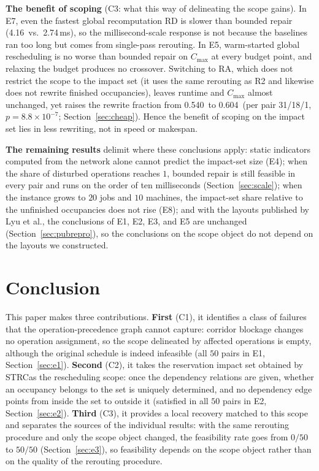\documentclass[manuscript,screen,review]{acmart}
\providecommand{\STRC}{\textsc{STRC}}
\newcommand{\NPairs}{50}
\newcommand{\FeasRone}{0/\NPairs}            %
\newcommand{\FeasRtwo}{\NPairs/\NPairs}      %
\newcommand{\MsRedecode}{4.16}       %
\newcommand{\MsCheapRtwo}{2.74}      %
\newcommand{\ResFracCheapRtwo}{0.540}
\newcommand{\ResFracAllFuture}{0.604}
\newcommand{\RAStabWTL}{31/18/1}     %
\newcommand{\RAStabP}{8.8\times10^{-7}}  %
\newcommand{\ScaleJobsHi}{20}
\newcommand{\ScaleMachHi}{10}
\begin{document}
\textbf{The benefit of scoping} (C3: what this way of delineating the scope gains). In E7, even the fastest global recomputation RD is slower than bounded repair
(\MsRedecode\ vs.\ \MsCheapRtwo\,ms), so the millisecond-scale response is not because the baselines ran too long but comes from single-pass rerouting.
In E5, warm-started global rescheduling is no worse than bounded repair on \(C_{\max}\) at every budget point, and relaxing the budget produces no crossover.
Switching to RA, which does not restrict the scope to the impact set (it uses the same rerouting as R2 and likewise does not rewrite finished occupancies),
leaves runtime and \(C_{\max}\) almost unchanged, yet raises the rewrite fraction from \ResFracCheapRtwo\ to \ResFracAllFuture\
(per pair \RAStabWTL, \(p=\RAStabP\); Section~\ref{sec:cheap}).
Hence the benefit of scoping on the impact set lies in less rewriting, not in speed or makespan.

\textbf{The remaining results} delimit where these conclusions apply: static indicators computed from the network alone cannot predict the impact-set size (E4);
when the share of disturbed operations reaches \(1\), bounded repair is still feasible in every pair and runs on the order of ten milliseconds (Section~\ref{sec:scale});
when the instance grows to \(\ScaleJobsHi\) jobs and \(\ScaleMachHi\) machines, the impact-set share relative to the unfinished occupancies does not rise (E8);
and with the layouts published by Lyu et al., the conclusions of E1, E2, E3, and E5 are unchanged (Section~\ref{sec:pubrepro}),
so the conclusions on the scope object do not depend on the layouts we constructed.

\section{Conclusion}
\label{sec:conclusion}

This paper makes three contributions. \textbf{First} (C1), it identifies a class of failures that the operation-precedence graph cannot capture: corridor blockage changes no operation assignment,
so the scope delineated by affected operations is empty, although the original schedule is indeed infeasible (all \(\NPairs\) pairs in E1, Section~\ref{sec:e1}).
\textbf{Second} (C2), it takes the reservation impact set obtained by \STRC as the rescheduling scope: once the dependency relations are given, whether an occupancy belongs to the set is
uniquely determined, and no dependency edge points from inside the set to outside it (satisfied in all \(\NPairs\) pairs in E2, Section~\ref{sec:e2}).
\textbf{Third} (C3), it provides a local recovery matched to this scope and separates the sources of the individual results: with the same rerouting procedure and only the scope object changed,
the feasibility rate goes from \(\FeasRone\) to \(\FeasRtwo\) (Section~\ref{sec:e3}),
so feasibility depends on the scope object rather than on the quality of the rerouting procedure.
\end{document}

